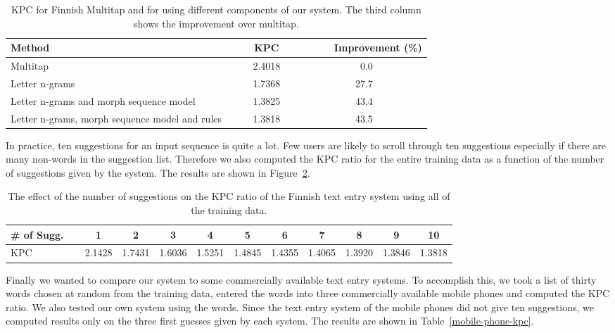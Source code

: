 \documentclass{llncs}
\begin{document}
\begin{table}
\begin{center}
\caption{KPC for Finnish Multitap and for using different components of
  our system. The third column shows the improvement over
  multitap.}\label{Finnish-kpc-table}
\begin{tabular}{lcr}
\hline
Method ~~~~& ~~~~KPC~~~~ &~~~~Improvement (\%)\\
\hline
Multitap                                       &2.4018 & 0.0~~~~~~~~~~\\
Letter n-grams                                 &1.7368 & 27.7~~~~~~~~~~\\
Letter n-grams and morph sequence model        &1.3825 & 43.4~~~~~~~~~~\\
Letter n-grams, morph sequence model and rules &1.3818 & 43.5~~~~~~~~~~\\
\hline
\end{tabular}
\end{center}
\end{table}

In practice, ten suggestions for an input sequence is quite a lot. Few
users are likely to scroll through ten suggestions especially if there
are many non-words in the suggestion list. Therefore we also computed
the KPC ratio for the entire training data as a function of the number
of suggestions given by the system. The results are shown in
Figure~\ref{fi-kpc-suggestions}.

\begin{table}\label{fi-kpc-suggestions}
\caption{The effect of the number of suggestions on the KPC ratio of the Finnish text entry system using all of the training data.}
\begin{center}
\begin{tabular}{lcccccccccc}
\hline
\# of Sugg.~~&  1 & 2 & 3 & 4 & 5 & 6 & 7 & 8 & 9 & 10\\
\hline
KPC & 2.1428 & 1.7431 & 1.6036 & 1.5251 & 1.4845 & 1.4355 & 1.4065 & 1.3920 & 1.3846 & 1.3818\\
\hline
\end{tabular}
\end{center}
\end{table}

Finally we wanted to compare our system to some commercially available
text entry systems. To accomplish this, we took a list of thirty words
chosen at random from the training data, entered the words into three
commercially available mobile phones and computed the KPC ratio. We
also tested our own system using the words. Since the text entry
system of the mobile phones did not give ten suggestions, we computed
results only on the three first guesses given by each system. The
results are shown in Table~\ref{mobile-phone-kpc}.
\end{document}
